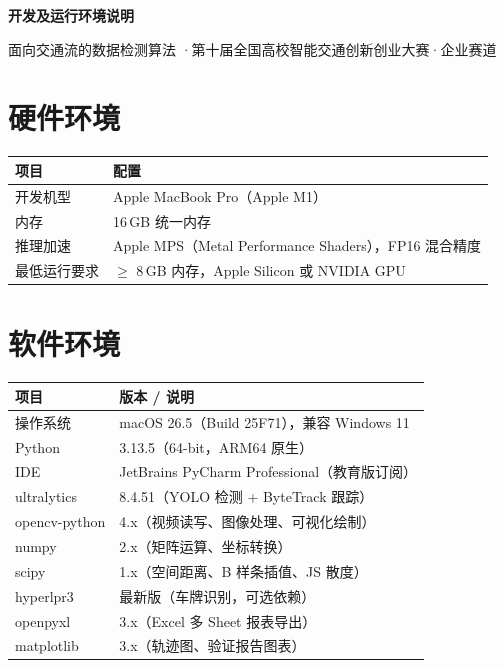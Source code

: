 \documentclass[12pt,a4paper]{ctexart}
\begin{document}
\begin{center}
    {\Large\bfseries 开发及运行环境说明}

    \vspace{0.4cm}
    面向交通流的数据检测算法 \quad·\quad 第十届全国高校智能交通创新创业大赛·企业赛道
\end{center}

\vspace{0.3cm}

\section{硬件环境}

\begin{table}[htbp]
    \centering
    \begin{tabularx}{\textwidth}{@{}p{3cm}L@{}}
        \toprule
        \textbf{项目} & \textbf{配置} \\
        \midrule
        开发机型 & Apple MacBook Pro（Apple M1） \\
        内存 & 16\,GB 统一内存 \\
        推理加速 & Apple MPS（Metal Performance Shaders），FP16 混合精度 \\
        最低运行要求 & $\geq$ 8\,GB 内存，Apple Silicon 或 NVIDIA GPU \\
        \bottomrule
    \end{tabularx}
\end{table}

\section{软件环境}

\begin{table}[htbp]
    \centering
    \begin{tabularx}{\textwidth}{@{}p{3cm}L@{}}
        \toprule
        \textbf{项目} & \textbf{版本 / 说明} \\
        \midrule
        操作系统 & macOS 26.5（Build 25F71），兼容 Windows 11 \\
        Python & 3.13.5（64-bit，ARM64 原生） \\
        IDE & JetBrains PyCharm Professional（教育版订阅） \\
        ultralytics & 8.4.51（YOLO 检测 + ByteTrack 跟踪） \\
        opencv-python & 4.x（视频读写、图像处理、可视化绘制） \\
        numpy & 2.x（矩阵运算、坐标转换） \\
        scipy & 1.x（空间距离、B 样条插值、JS 散度） \\
        hyperlpr3 & 最新版（车牌识别，可选依赖） \\
        openpyxl & 3.x（Excel 多 Sheet 报表导出） \\
        matplotlib & 3.x（轨迹图、验证报告图表） \\
        \bottomrule
    \end{tabularx}
\end{table}
\end{document}
